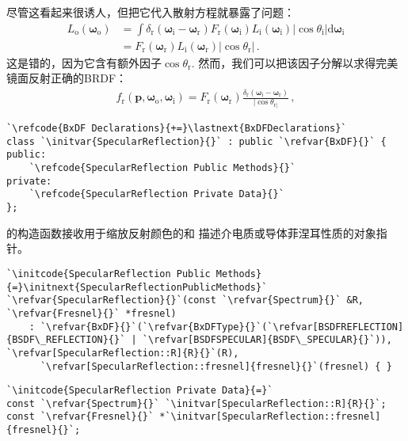 尽管这看起来很诱人，但把它代入散射方程就暴露了问题：
\begin{align*}
    L_{\mathrm{o}}({\bm\omega}_{\mathrm{o}}) & =\int{\delta_{\mathrm{r}}({\bm\omega}_{\mathrm{i}}-{\bm\omega}_{\mathrm{r}})F_{\mathrm{r}}({\bm\omega}_{\mathrm{i}})}L_{\mathrm{i}}({\bm\omega}_{\mathrm{i}})|\cos\theta_{\mathrm{i}}|\mathrm{d}{\bm\omega}_{\mathrm{i}} \\
                                             & =F_{\mathrm{r}}({\bm\omega}_{\mathrm{r}})L_{\mathrm{i}}({\bm\omega}_{\mathrm{r}})|\cos\theta_{\mathrm{r}}|\, .
\end{align*}
这是错的，因为它含有额外因子$\cos\theta_{\mathrm{r}}$.
然而，我们可以把该因子分解以求得完美镜面反射正确的BRDF：
\begin{align*}
    f_\mathrm{r}({\bm p},{\bm \omega}_\mathrm{o},{\bm \omega}_\mathrm{i})=F_{\mathrm{r}}({\bm\omega}_{\mathrm{r}})\frac{\delta_{\mathrm{r}}({\bm\omega}_{\mathrm{i}}-{\bm\omega}_{\mathrm{r}})}{|\cos\theta_{\mathrm{r}|}}\, ,
\end{align*}
\begin{lstlisting}
`\refcode{BxDF Declarations}{+=}\lastnext{BxDFDeclarations}`
class `\initvar{SpecularReflection}{}` : public `\refvar{BxDF}{}` {
public:
    `\refcode{SpecularReflection Public Methods}{}`
private:
    `\refcode{SpecularReflection Private Data}{}`
};
\end{lstlisting}

的构造函数接收用于缩放反射颜色的和
描述介电质或导体菲涅耳性质的对象指针。
\begin{lstlisting}
`\initcode{SpecularReflection Public Methods}{=}\initnext{SpecularReflectionPublicMethods}`
`\refvar{SpecularReflection}{}`(const `\refvar{Spectrum}{}` &R, `\refvar{Fresnel}{}` *fresnel) 
    : `\refvar{BxDF}{}`(`\refvar{BxDFType}{}`(`\refvar[BSDFREFLECTION]{BSDF\_REFLECTION}{}` | `\refvar[BSDFSPECULAR]{BSDF\_SPECULAR}{}`)), `\refvar[SpecularReflection::R]{R}{}`(R),
      `\refvar[SpecularReflection::fresnel]{fresnel}{}`(fresnel) { }
\end{lstlisting}
\begin{lstlisting}
`\initcode{SpecularReflection Private Data}{=}`
const `\refvar{Spectrum}{}` `\initvar[SpecularReflection::R]{R}{}`;
const `\refvar{Fresnel}{}` *`\initvar[SpecularReflection::fresnel]{fresnel}{}`;
\end{lstlisting}

